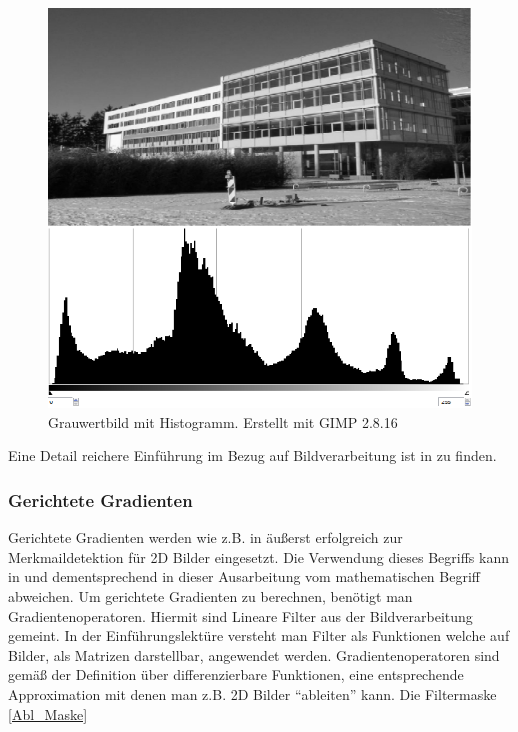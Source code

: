\begin{figure}[thpb]
	\centering
	\includegraphics[width=\linewidth]{1-Einleitung/pics/pic_histo_uni01.png}
	\caption{Grauwertbild mit Histogramm. Erstellt mit GIMP 2.8.16}
	\label{histo_pic}
\end{figure}



Eine Detail reichere Einführung im Bezug auf Bildverarbeitung ist in \cite{Priese15} zu finden.

\subsubsection{Gerichtete Gradienten}
Gerichtete Gradienten werden wie z.B. in \cite{dalal2005histograms} äußerst erfolgreich zur Merkmaildetektion für 2D Bilder eingesetzt. Die Verwendung dieses Begriffs kann in \cite{scherer2010histograms} und dementsprechend in dieser Ausarbeitung vom mathematischen Begriff abweichen.
\newline
Um gerichtete Gradienten zu berechnen, benötigt man Gradientenoperatoren. Hiermit sind Lineare Filter aus der Bildverarbeitung gemeint. In der Einführungslektüre \cite{Priese15} versteht man Filter als Funktionen welche auf Bilder, als Matrizen darstellbar, angewendet werden. Gradientenoperatoren sind gemäß der Definition über differenzierbare Funktionen, eine entsprechende Approximation mit denen man z.B. 2D Bilder "`ableiten"' kann. Die Filtermaske \ref{Abl_Maske} 

